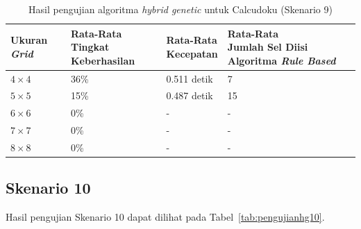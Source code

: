 \begin{table}
\centering
\captionsetup{justification=centering}
\caption[Hasil pengujian algoritma \textit{hybrid genetic} untuk Calcudoku (Skenario 9)]{Hasil pengujian algoritma \textit{hybrid genetic} untuk Calcudoku (Skenario 9)}
\begin{tabular}{| l | l | l | l |}
\hline
Ukuran \textit{Grid} & \makecell[l]{Rata-Rata \\ Tingkat Keberhasilan} & \makecell[l]{Rata-Rata \\ Kecepatan} & \makecell[l]{Rata-Rata \\ Jumlah Sel Diisi Algoritma \textit{Rule Based}} \\
\hline \hline
\begin{math}4 \times 4\end{math} & 36\% & 0.511 detik & 7 \\
\hline
\begin{math}5 \times 5\end{math} & 15\% & 0.487 detik & 15 \\
\hline
\begin{math}6 \times 6\end{math} & 0\% & - & - \\
\hline
\begin{math}7 \times 7\end{math} & 0\% & - & - \\
\hline
\begin{math}8 \times 8\end{math} & 0\% & - & - \\
\hline
\end{tabular}
\label{tab:pengujianhg9}
\end{table}

\subsection{Skenario 10}
\label{sec:skenario10}

Hasil pengujian Skenario 10 dapat dilihat pada Tabel~\ref{tab:pengujianhg10}.

